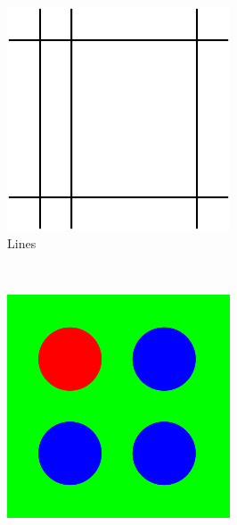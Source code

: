 \begin{figure}[h]
\centering
 \begin{subfigure}[b]{0.3\linewidth}
 \centering
 \includegraphics[width=\linewidth]{graphics/Marker2a}
 \caption{Lines}
 \label{marker:cross}
 \end{subfigure}~
 \begin{subfigure}[b]{0.3\linewidth}
 \centering
 \includegraphics[width=\linewidth]{graphics/Marker1}

\end{subfigure}
\end{figure}
